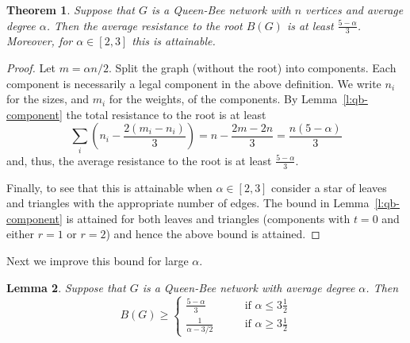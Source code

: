 \documentclass[11pt]{article}
\newtheorem{theorem}{Theorem}
\newtheorem{lemma}[theorem]{Lemma}
\theoremstyle{remark}
\def\a{\alpha}
\begin{document}
\begin{theorem}\label{t:qb-2-3}
  Suppose that $G$ is a Queen-Bee network with $n$ vertices and average degree
  $\a$. Then the average resistance to the root $B(G)$ is at least
  $\frac{5-\a}{3}$. Moreover, for $\a\in [2,3]$ this is attainable.
\end{theorem}
\begin{proof}
  Let $m=\a n/2$.  Split the graph (without the root) into
  components. Each component is necessarily a legal component in the
  above definition. We write $n_i$ for the sizes, and $m_i$ for the
  weights, of the components.  By Lemma~\ref{l:qb-component} the total
  resistance to the root is at least
  \[
  \sum_i \left(n_i-\frac{2(m_i-n_i)}{3}\right)=n-\frac{2m-2n}{3}=\frac{n (5-\a)}{3}
  \]
  and, thus, the average resistance to the root is at least $\frac{5-\a}{3}$.

  Finally, to see that this is attainable when $\a\in [2,3]$
  consider a star of leaves and triangles with the appropriate number
  of edges. The bound in Lemma~\ref{l:qb-component} is attained for both
  leaves and triangles (components with $t=0$ and either $r=1$ or
  $r=2$) and hence the above bound is attained.
\end{proof}
Next we improve this bound for large $\a$.
\begin{lemma}\label{l:qb-all-a}
  Suppose that $G$ is a Queen-Bee network with average degree $\a$. Then
  \[
  B(G)\ge
  \begin{cases}
    \frac{5-\a}3\qquad&\text{if $\a\le 3\frac12$}\\
    \frac{1}{\a-3/2}\qquad&\text{if $\a\ge 3\frac12$}
  \end{cases}
  \]
\end{lemma}
\end{document}
